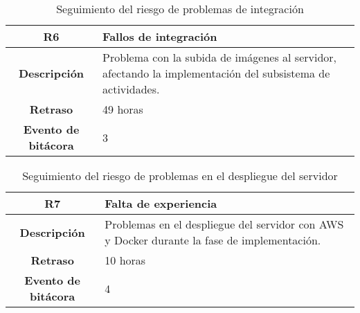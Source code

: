 \vspace{0.5cm}

\begin{table}[H]
	\centering
	\begin{tabular}{ | c | m{13cm} | }
		\hline
		{\textbf{R6}}               & {Fallos de integración}                                                                                    \\
		\hline
		\textbf{Descripción}        & Problema con la subida de imágenes al servidor, afectando la implementación del subsistema de actividades. \\
		\hline
		\textbf{Retraso}            & 49 horas                                                                                                   \\
		\hline
		\textbf{Evento de bitácora} & 3                                                                                                          \\
		\hline
	\end{tabular}
	\caption{Seguimiento del riesgo de problemas de integración}
\end{table}

\vspace{0.5cm}

\begin{table}[H]
	\centering
	\begin{tabular}{ | c | m{13cm} | }
		\hline
		{\textbf{R7}}               & {Falta de experiencia}                                                                      \\
		\hline
		\textbf{Descripción}        & Problemas en el despliegue del servidor con AWS y Docker durante la fase de implementación. \\
		\hline
		\textbf{Retraso}            & 10 horas                                                                                    \\
		\hline
		\textbf{Evento de bitácora} & 4                                                                                           \\
		\hline
	\end{tabular}
	\caption{Seguimiento del riesgo de problemas en el despliegue del servidor}
\end{table}
